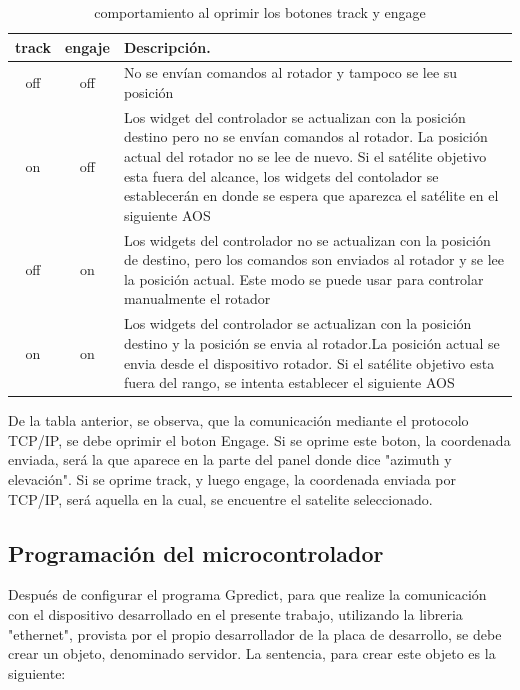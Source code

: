 \begin{table}[h!]
	\begin{tabular}{|c|c|p{11.0cm}|}
		\hline 
		track & engaje & Descripción. \\
		\hline 
		off & off  & No se envían comandos al rotador y tampoco se lee su posición \\ 
		\hline 
		on  & off  &   Los widget del controlador se actualizan con la posición destino pero no se envían comandos al rotador. La posición actual del rotador no se lee de nuevo. Si el satélite objetivo esta fuera del alcance, los widgets del contolador se establecerán en donde se espera que aparezca el satélite en el siguiente AOS \\
		\hline 
		off & on  &    Los widgets del controlador no se actualizan con la posición de destino, pero los comandos son enviados al rotador y se lee la posición actual.  Este modo se puede usar para controlar manualmente el rotador\\ 
		\hline 
		on  & on   &    Los widgets del controlador se actualizan con la posición destino y la posición se envia al rotador.La posición actual se envia desde el dispositivo rotador. 
		Si el satélite objetivo esta fuera del rango, se intenta establecer el siguiente AOS \\
		\hline 
				
	\end{tabular}
	\caption{comportamiento al oprimir los botones track y engage}
\end{table}

De la tabla anterior, se observa, que la comunicación mediante el protocolo TCP/IP, se debe oprimir el boton Engage. Si se oprime este boton, la coordenada enviada, será la que aparece en la parte del panel donde dice "azimuth y elevación". Si se oprime track, y luego engage, la coordenada enviada por TCP/IP, será aquella en la cual, se encuentre el satelite seleccionado. 

\subsection{Programación del microcontrolador} 

Después de configurar el programa Gpredict, para que realize la comunicación con el dispositivo desarrollado en el presente trabajo, utilizando la libreria "ethernet", provista por el propio desarrollador de la placa de desarrollo, se debe crear un objeto, denominado servidor. La sentencia, para crear este objeto es la siguiente: 

